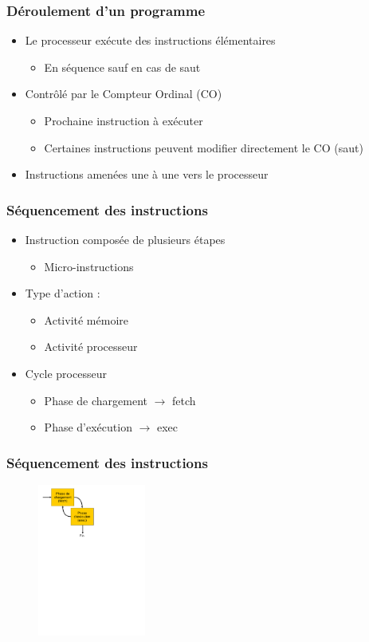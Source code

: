 \begin{frame}
\frametitle{Déroulement d'un programme}
\begin{itemize}
\item Le processeur exécute des instructions élémentaires 
\begin{itemize}
\item En séquence sauf en cas de saut
\end{itemize}
\item Contrôlé par le Compteur Ordinal (CO)
\begin{itemize}
\item Prochaine instruction à exécuter
\item Certaines instructions peuvent modifier directement le CO (saut)
\end{itemize}
\item Instructions amenées une à une vers le processeur
\end{itemize}
\end{frame}


\begin{frame}
\frametitle{Séquencement des instructions}
\begin{itemize}
\item Instruction composée de plusieurs étapes
\begin{itemize}
\item Micro-instructions
\end{itemize}
\item Type d'action :
\begin{itemize}
\item Activité mémoire
\item Activité processeur
\end{itemize}
\item Cycle processeur
\begin{itemize}
\item Phase de chargement $\rightarrow$ fetch
\item Phase d'exécution $\rightarrow$ exec
\end{itemize}
\end{itemize}
\end{frame}


\begin{frame}
\frametitle{Séquencement des instructions}
\begin{figure}[htbp]
\includegraphics[height=5cm]{../illustration/phases_exec.pdf}
\end{figure}
\end{frame}


